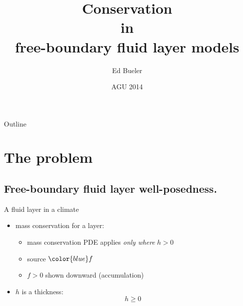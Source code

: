 \documentclass{beamer}
\title[Conservation in free-boundary layers] %
{Conservation \\ in \\ free-boundary fluid layer models}
\author{Ed Bueler}
\institute[UAF] %
{
  Dept of Mathematics and Statistics, and Geophysical Institute\\
  University of Alaska Fairbanks%
}
\date{{\scriptsize AGU 2014}}
\newcommand\bq{\mathbf{q}}
\newcommand{\Div}{\nabla\cdot}
\begin{document}
\graphicspath{{../images/}{../../talks-public/commonfigs/}}

\begin{frame}
  \titlepage
\end{frame}

\begin{frame}{Outline}
  \tableofcontents
\end{frame}





\section{The problem}

\subsection{Free-boundary fluid layer well-posedness.}

\begin{frame}{A fluid layer in a climate}

\begin{center}
\end{center}

\vspace{-9mm}
  \begin{itemize}
  \item mass conservation for a layer:
     \only<1>{$$h_t + \Div\bq = f$$}
     \only<2->{$$h_t + \Div\bq = {\color{blue} f}$$}
    \begin{itemize}
    \vspace{-4mm}
    \item<1->[$\circ$] mass conservation PDE applies \emph{only where} $h>0$
    \item<2->[$\circ$] source ${\color{blue} f}$
    \item<2->[$\circ$] $f>0$ shown downward (accumulation)
    \end{itemize}
  \item<3> $h$ is a thickness:
      $$h\ge 0$$
  \end{itemize}
\end{frame}
\end{document}
